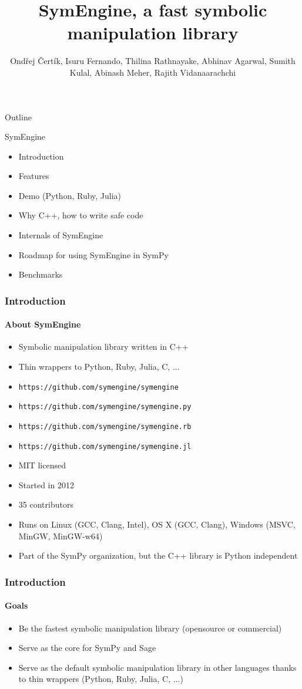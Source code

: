 \documentclass{beamer}
\title[SymEngine \hspace{14em}\insertframenumber/
\inserttotalframenumber]{SymEngine, a fast symbolic manipulation library}
\author[O. Čertík, I. Fernando, ...]{Ondřej Čertík, Isuru Fernando, Thilina Rathnayake, Abhinav Agarwal, Sumith Kulal, Abinash Meher, Rajith Vidanaarachchi}
\begin{document}
\begin{frame}
\maketitle
\end{frame}


\begin{frame}{Outline}
\begin{block}{SymEngine}
\begin{itemize}
\item Introduction
\item Features
\item Demo (Python, Ruby, Julia)
\item Why C++, how to write safe code
\item Internals of SymEngine
\item Roadmap for using SymEngine in SymPy
\item Benchmarks
\end{itemize}
\end{block}
\end{frame}


\begin{frame}
\frametitle{Introduction}
\framesubtitle{About SymEngine}
\begin{itemize}
\item Symbolic manipulation library written in C++
\item Thin wrappers to Python, Ruby, Julia, C, ...
\item \texttt{https://github.com/symengine/symengine}
\item \texttt{https://github.com/symengine/symengine.py}
\item \texttt{https://github.com/symengine/symengine.rb}
\item \texttt{https://github.com/symengine/symengine.jl}
\item MIT licensed
\item Started in 2012
\item 35 contributors
\item Runs on Linux (GCC, Clang, Intel), OS X (GCC, Clang), Windows (MSVC,
    MinGW, MinGW-w64)
\item Part of the SymPy organization, but the C++ library is Python independent
\end{itemize}
\end{frame}


\begin{frame}
\frametitle{Introduction}
\framesubtitle{Goals}
\begin{itemize}
\item Be the fastest symbolic manipulation library (opensource or commercial)
\item Serve as the core for SymPy and Sage
\item Serve as the default symbolic manipulation library in other languages
    thanks to thin wrappers (Python, Ruby, Julia, C, ...)
\end{itemize}
\end{frame}
\end{document}
